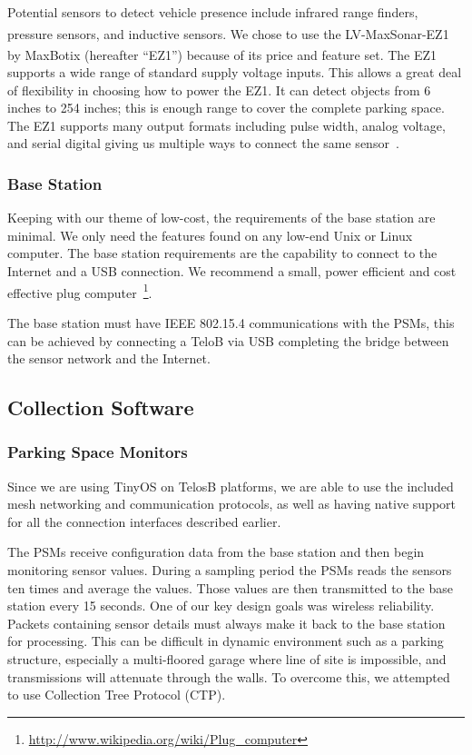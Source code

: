 \documentclass{acm_proc}
\begin{document}
Potential sensors to detect vehicle presence include infrared range
finders, pressure sensors, and inductive sensors.
We chose to use the
LV-MaxSonar\textsuperscript{\textregistered}-EZ1\textsuperscript{\texttrademark}
by MaxBotix\textsuperscript{\textregistered} (hereafter ``EZ1'')
because of its price and feature set.
The EZ1 supports a wide range of standard supply voltage inputs.
This allows a great deal of flexibility in choosing how to power the EZ1.
It can detect objects from 6 inches to 254 inches; this is enough range to
cover the complete parking space.
The EZ1 supports many output formats including pulse width, analog voltage,
and serial digital giving us multiple ways to connect the same
sensor~\cite{maxbotix:maxsonar-datasheet}.

\subsubsection{Base Station}
Keeping with our theme of low-cost, the requirements of the base station
are minimal.
We only need the features found on any low-end Unix or Linux computer.
The base station requirements are the capability to connect to the Internet
and a USB connection.
We recommend a small, power efficient and cost effective plug
computer~\footnote{\url{http://www.wikipedia.org/wiki/Plug_computer}}.

The base station must have IEEE 802.15.4 communications with the PSMs, this
can be achieved by connecting a TeloB via USB completing the bridge between
the sensor network and the Internet.

\subsection{Collection Software}

\subsubsection{Parking Space Monitors}

Since we are using TinyOS on TelosB platforms, we are able to use the
included mesh networking and communication protocols, as well as having
native support for all the connection interfaces described earlier.

The PSMs receive configuration data from the base station and then begin
monitoring sensor values.
During a sampling period the PSMs reads the sensors ten times and average
the values.
Those values are then transmitted to the base station every 15 seconds.
One of our key design goals was wireless reliability.
Packets containing sensor details must always make it back to the base
station for processing.
This can be difficult in dynamic environment such as a parking structure,
especially a multi-floored garage where line of site is impossible, and
transmissions will attenuate through the walls.
To overcome this, we attempted to use Collection Tree Protocol (CTP).
\end{document}
